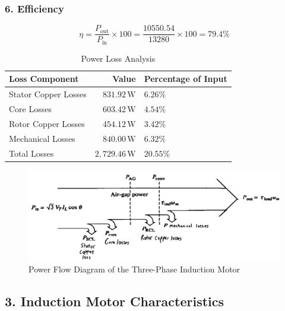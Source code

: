 \documentclass[a4paper,12pt]{article}
\begin{document}
\subsubsection{6. Efficiency}
\begin{equation}
    \eta = \frac{P_{\text{out}}}{P_{\text{in}}} \times 100 = \frac{10550.54}{13280} \times 100 = 79.4\%
\end{equation}

\begin{table}[h]
\centering
\caption{Power Loss Analysis}
\begin{tabular}{lrl}
\hline
Loss Component & Value & Percentage of Input \\
\hline
Stator Copper Losses & $831.92\,\text{W}$ & $6.26\%$ \\
Core Losses & $603.42\,\text{W}$ & $4.54\%$ \\
Rotor Copper Losses & $454.12\,\text{W}$ & $3.42\%$ \\
Mechanical Losses & $840.00\,\text{W}$ & $6.32\%$ \\
\hline
Total Losses & $2,729.46\,\text{W}$ & $20.55\%$ \\
\hline
\end{tabular}
\label{tab:losses}
\end{table}
 
\begin{figure}[h]
    \centering
    \includegraphics[width=\textwidth]{power_flow_diagram.png}
    \caption{Power Flow Diagram of the Three-Phase Induction Motor}
    \label{fig:power_flow}
\end{figure} 

\newpage
\subsection{3. Induction Motor Characteristics}
\end{document}
